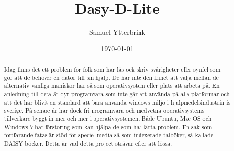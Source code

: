 \documentclass{report}
\begin{document}
\title{Dasy-D-Lite}
\author{Samuel Ytterbrink}
\date{\today}
\maketitle

\begin{abstract}
Idag finns det ett problem för folk som har läs ock skriv svårigheter eller synfel som gör att de  behöver en dator till sin hjälp. 
De har inte den frihet att välja mellan de alternativ vanliga mäniskor har så som operativsystem eller plats att arbeta på. En anledning till deta är dyr programvara som inte går att använda på alla platformar och att det har blivit en standard att bara använda windows miljö i hjälpmedelsindustrin is sverige. På senare år har dock fri programvara och medvetna operativsystems tillverkare byggt in mer och mer i operativsystemen. Både Ubuntu, Mac OS och Windows 7 har förstoring som kan hjälpa de som har lätta problem. En sak som fortfarande fatas är stöd för speciel media så som indexerade talböker, så kallade DAISY böcker. Detta är vad detta project strävar efter att lössa.
\end{abstract}
\end{document}
